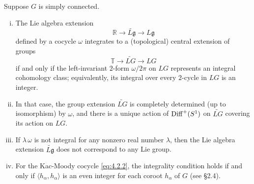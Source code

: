 \documentclass[12pt]{article}
\begin{document}
\begin{theorem}\label{thm:PS-4.4.1}
    Suppose $G$ is simply connected.
    \begin{enumerate}[(i)]
        \item The Lie algebra extension
              \[
                  \mathbb{R} \longrightarrow \widetilde{L\mathfrak g} \longrightarrow L\mathfrak g
              \]
              defined by a cocycle $\omega$ integrates to a (topological) central extension of groups
              \[
                  \mathbb{T} \longrightarrow \widetilde{LG} \longrightarrow LG
              \]
              if and only if the left-invariant $2$-form $\omega/2\pi$ on $LG$ represents an integral cohomology class; equivalently, its integral over every $2$-cycle in $LG$ is an integer.

        \item In that case, the group extension $\widetilde{LG}$ is completely determined (up to isomorphism) by $\omega$, and there is a unique action of $\operatorname{Diff}^+(S^1)$ on $\widetilde{LG}$ covering its action on $LG$.

        \item If $\lambda\,\omega$ is not integral for any nonzero real number $\lambda$, then the Lie algebra extension $\widetilde{L\mathfrak g}$ does not correspond to any Lie group.

        \item For the Kac-Moody cocycle \eqref{eq:4.2.2}, the integrality condition holds if and only if $\langle h_\alpha, h_\alpha\rangle$ is an even integer for each coroot $h_\alpha$ of $G$ (see §2.4).
    \end{enumerate}
\end{theorem}
\end{document}

